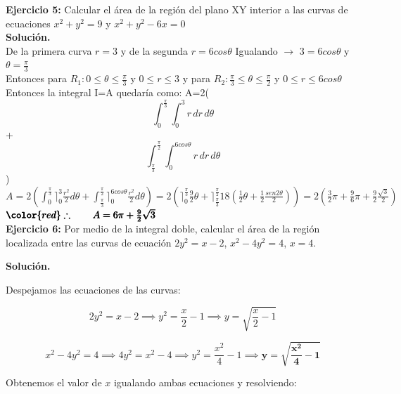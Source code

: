 \documentclass[12pt]{article}
\begin{document}
\noindent \textbf{Ejercicio 5:} Calcular el área de la región del plano XY interior a las curvas de ecuaciones $x^2+y^2=9$ y $x^2+y^2-6x=0$
\\[10pt]
\textbf{Solución.}
\\[10pt]
De la primera curva $r=3$ y de la segunda $r=6cos\theta$ Igualando $\rightarrow$ $3=6cos\theta$ y $\theta=\frac{\pi}{3}$
\\[2pt]
Entonces para $R_{1}: 0\leq \theta \leq \frac{\pi}{3}$ y $0\leq r \leq3$ y para $R_{2}: \frac{\pi}{3}\leq \theta \leq \frac{\pi}{2}$ y $0\leq r \leq6cos\theta$
\\[2pt]
Entonces la integral I=A quedaría como:
A=2(\[ \int_{0}^{\frac{\pi}{3}} \int_{0}^{3} r \,dr\,d\theta \]+\[ \int_{\frac{\pi}{3}}^{\frac{\pi}{2}} \int_{0}^{6cos\theta} r \,dr\,d\theta \])
\\[2pt]
$A=2(\int_{0}^{\frac{\pi}{3}}\rceil_{0}^{3} \frac{r^2}{2}d\theta+\int_{\frac{\pi}{3}}^{\frac{\pi}{2}}\rceil_{0}^{6cos\theta} \frac{r^2}{2}d\theta)=2(\rceil_{0}^{\frac{\pi}{3}}\frac{9}{2}\theta+\rceil_{\frac{\pi}{3}}^\frac{\pi}{2}18(\frac{1}{2}\theta+\frac{1}{2}\frac{sen2\theta}{2}))=2(\frac{3}{2}\pi+\frac{9}{6}\pi+\frac{9}{2}\frac{\sqrt{3}}{2})$
\\[9pt]
$\pmb{\color{red} \therefore \qquad A= 6\pi+\frac{9}{2}\sqrt{3}}$
\\[15pt]

\noindent \textbf{Ejercicio 6:} Por medio de la integral doble, calcular el área de la región localizada entre las curvas de ecuación $2y^2=x-2$, $x^2-4y^2=4$, $x=4$.

\vspace{5mm}

\noindent \textbf{Solución.}

\vspace{5mm}

\noindent Despejamos las ecuaciones de las curvas:

\begin{equation}\tag{1}
	2y^2 = x-2 \implies y^2 = \frac{x}{2}-1 \implies y = \sqrt{\frac{x}{2}-1}
\end{equation}

\begin{equation}\tag{2}
	x^2-4y^2=4 \implies 4y^2=x^2-4 \implies y^2=\frac{x^2}{4}-1 \implies \boldsymbol{y=\sqrt{\frac{x^2}{4}-1}} 
\end{equation}

\noindent Obtenemos el valor de $x$ igualando ambas ecuaciones y resolviendo:
\end{document}
